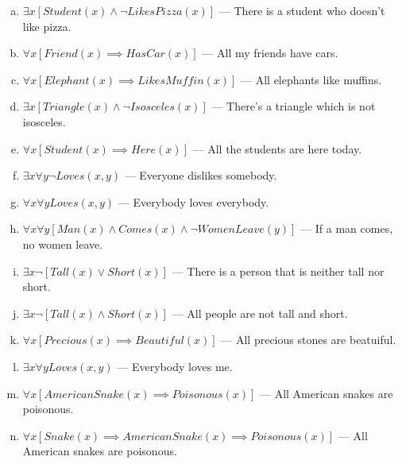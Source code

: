 \documentclass{article}
\begin{document}
\begin{enumerate}[(a)]
\item $\exists x [Student(x) \wedge \neg LikesPizza(x)]$ --- There is a student who doesn't like pizza.
\item $\forall x [Friend(x) \implies HasCar(x)]$ --- All my friends have cars.
\item $\forall x [Elephant(x) \implies LikesMuffin(x)]$ --- All elephants like muffins.
\item $\exists x [Triangle(x) \wedge \neg Isosceles(x)]$ --- There's a triangle which is not isosceles.
\item $\forall x [Student(x) \implies Here(x)]$ --- All the students are here today.
\item $\exists x \forall y \neg Loves(x, y)$ --- Everyone dislikes somebody.
\item $\forall x \forall y Loves(x, y)$ --- Everybody loves everybody.
\item $\forall x \forall y[Man(x) \wedge Comes(x) \wedge \neg WomenLeave(y)]$ --- If a man comes, no women leave.
\item $\exists x \neg [Tall(x) \vee Short(x)]$ --- There is a person that is neither tall nor short.
\item $\exists x \neg [Tall(x) \wedge Short(x)]$ --- All people are not tall and short.
\item $\forall x [Precious(x) \implies Beautiful(x)]$ --- All precious stones are beatuiful.
\item $\exists x \forall y Loves(x, y)$ --- Everybody loves me.
\item $\forall x [AmericanSnake(x) \implies Poisonous(x)]$ --- All American snakes are poisonous.
\item $\forall x [Snake(x) \implies AmericanSnake(x) \implies Poisonous(x)]$ --- All American snakes are poisonous.
\end{enumerate}
\end{document}
